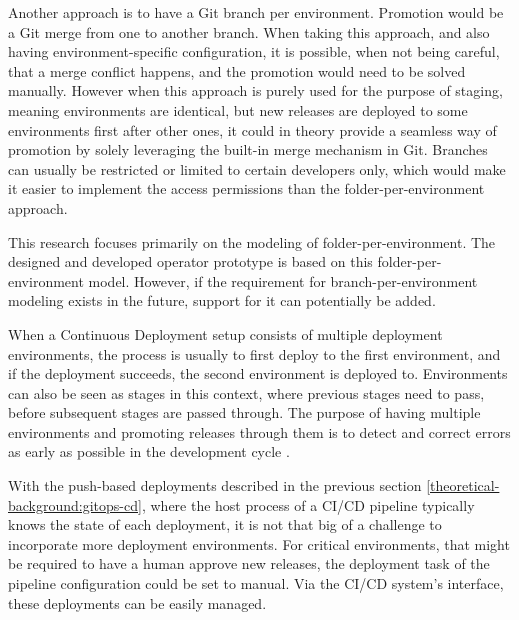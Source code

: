 Another approach is to have a Git branch per environment.
Promotion would be a Git merge from one to another branch.
When taking this approach, and also having environment-specific configuration,
it is possible, when not being careful, that a merge conflict happens,
and the promotion would need to be solved manually.
However when this approach is purely used for the purpose of staging,
meaning environments are identical, but new releases are deployed to some environments first
after other ones,
it could in theory provide a seamless way of promotion by solely leveraging the built-in merge mechanism in Git.
Branches can usually be restricted or limited to certain developers only,
which would make it easier to implement the access permissions than the folder-per-environment approach.

This research focuses primarily on the modeling of folder-per-environment.
The designed and developed operator prototype is based on this folder-per-environment model.
However, if the requirement for branch-per-environment modeling exists in the future,
support for it can potentially be added.







When a Continuous Deployment setup consists of multiple deployment environments,
the process is usually to first deploy to the first environment,
and if the deployment succeeds, the second environment is deployed to.
Environments can also be seen as stages in this context,
where previous stages need to pass, before subsequent stages are passed through.
The purpose of having multiple environments and promoting releases through them
is to detect and correct errors as early as possible in the development cycle
\autocite{gitopsAndKubernetes2021continuous}.

With the push-based deployments described in the previous section \ref{theoretical-background:gitops-cd},
where the host process of a CI/CD pipeline typically knows the state of each deployment,
it is not that big of a challenge to incorporate more deployment environments.
For critical environments, that might be required to have a human approve new releases,
the deployment task of the pipeline configuration could be set to manual.
Via the CI/CD system's interface, these deployments can be easily managed.

